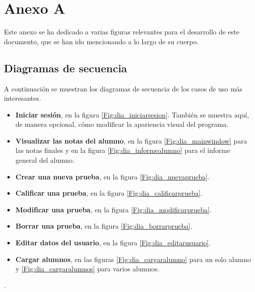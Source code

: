 \chapter{Anexo A}
\label{cap:AnexoA}

Este anexo se ha dedicado a varias figuras relevantes para el desarrollo de este documento, que se han ido mencionando a lo largo de su cuerpo.


\section{Diagramas de secuencia}
\label{ana:diagramassecuencia}
A continuación se muestran los diagramas de secuencia de los casos de uso más interesantes.

\begin{itemize}
	\item\textbf{Iniciar sesión}, en la figura \ref{Fig:dia_iniciarsesion}. También se muestra aquí, de manera opcional, cómo modificar la apariencia visual del programa.
	\item\textbf{Visualizar las notas del alumno}, en la figura \ref{Fig:dia_mainwindow} para las notas finales y en la figura \ref{Fig:dia_informealumno} para el informe general del alumno.
	\item\textbf{Crear una nueva prueba}, en la figura \ref{Fig:dia_nuevaprueba}.
	\item\textbf{Calificar una prueba}, en la figura \ref{Fig:dia_calificarprueba}.
	\item\textbf{Modificar una prueba}, en la figura \ref{Fig:dia_modificarprueba}.
	\item\textbf{Borrar una prueba}, en la figura \ref{Fig:dia_borrarprueba}.
	\item\textbf{Editar datos del usuario}, en la figura \ref{Fig:dia_editarusuario}.
	\item\textbf{Cargar alumnos}, en las figuras \ref{Fig:dia_cargaralumno} para un solo alumno y \ref{Fig:dia_cargaralumnos} para varios alumnos.
\end{itemize}.

\newpage

